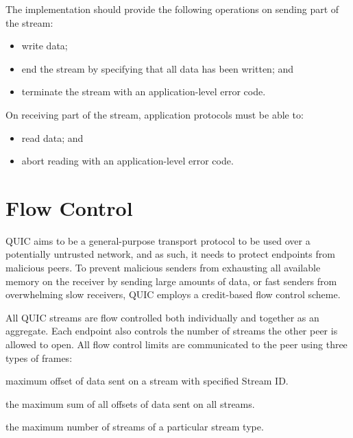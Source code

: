 The implementation should provide the following operations on sending part of the stream:

\begin{itemize}

  \item write data;

  \item end the stream by specifying that all data has been written; and

  \item terminate the stream with an application-level error code.

\end{itemize}

On receiving part of the stream, application protocols must be able to:

\begin{itemize}

  \item read data; and

  \item abort reading with an application-level error code.

\end{itemize}

\section{Flow Control}

QUIC aims to be a general-purpose transport protocol to be used over a potentially untrusted
network, and as such, it needs to protect endpoints from malicious peers. To prevent malicious
senders from exhausting all available memory on the receiver by sending large amounts of data, or
fast senders from overwhelming slow receivers, QUIC employs a credit-based flow control scheme.

All QUIC streams are flow controlled both individually and together as an aggregate. Each endpoint
also controls the number of streams the other peer is allowed to open. All flow control limits are
communicated to the peer using three types of frames:

\begin{itemize}

\litem[]{\MAXSTREAMDATA{}} maximum offset of data sent on a stream with specified Stream ID\@.

\litem[]{\MAXDATA{}} the maximum sum of all offsets of data sent on all streams.

\litem[]{\MAXSTREAMS{}} the maximum number of streams of a particular stream type.

\end{itemize}

